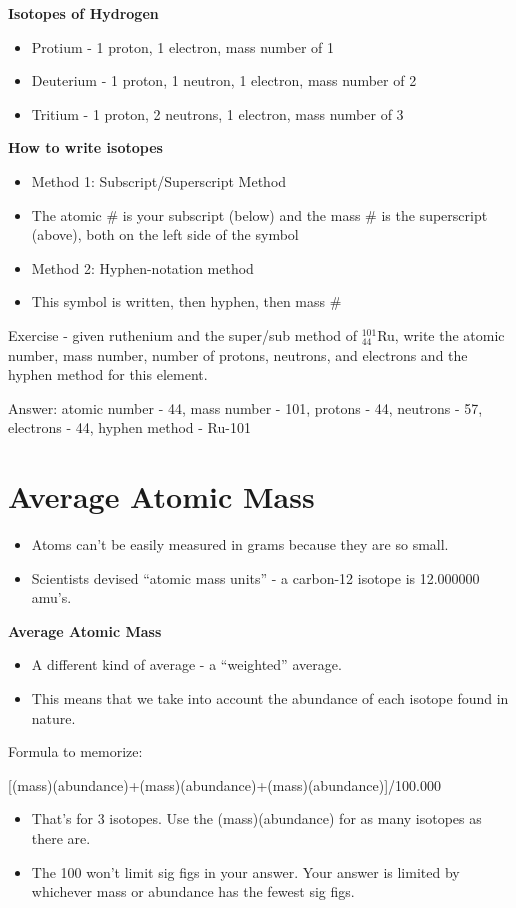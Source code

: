 \documentclass[../hchem.tex]{subfiles}
\begin{document}
\textbf{Isotopes of Hydrogen}
\begin{itemize}
    \item Protium - 1 proton, 1 electron, mass number of 1 
    \item Deuterium - 1 proton, 1 neutron, 1 electron, mass number of 2 
    \item Tritium - 1 proton, 2 neutrons, 1 electron, mass number of 3
\end{itemize}

\textbf{How to write isotopes}
\begin{itemize}
    \item Method 1: Subscript/Superscript Method 
    \item The atomic \# is your subscript (below) and the mass \# is the superscript (above), both on the left side of the symbol
    
    \item Method 2: Hyphen-notation method 
    \item This symbol is written, then hyphen, then mass \#
\end{itemize}

Exercise - given ruthenium and the super/sub method of $^{101}_44$Ru, 
write the atomic number, mass number, number of protons, neutrons, and electrons and the hyphen method for this element.

Answer: atomic number - 44, mass number - 101, protons - 44, neutrons - 57, electrons - 44, hyphen method - Ru-101
\section{Average Atomic Mass}
\begin{itemize}
    \item Atoms can't be easily measured in grams because they are so small.
    \item Scientists devised ``atomic mass units'' - a carbon-12 isotope is 12.000000 amu's.
\end{itemize}

\textbf{Average Atomic Mass}
\begin{itemize}
    \item A different kind of average - a ``weighted'' average.
    \item This means that we take into account the abundance of each isotope found in nature.
\end{itemize}

Formula to memorize:
\begin{center}
    [(mass)(abundance)+(mass)(abundance)+(mass)(abundance)]/100.000
\end{center}
\begin{itemize}
    \item That's for 3 isotopes. Use the (mass)(abundance) for as many isotopes as there are.
    \item The 100 won't limit sig figs in your answer. Your answer is limited by whichever mass or abundance has the fewest sig figs.
\end{itemize}
\end{document}
